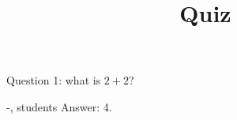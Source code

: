 \documentclass{article}
\title{Quiz}
\author{}
\date{}
\begin{document}
\maketitle

Question 1: what is $2+2$?

\begin{shownto}{-, students}
    Answer: 4.
\end{shownto}
\end{document}
